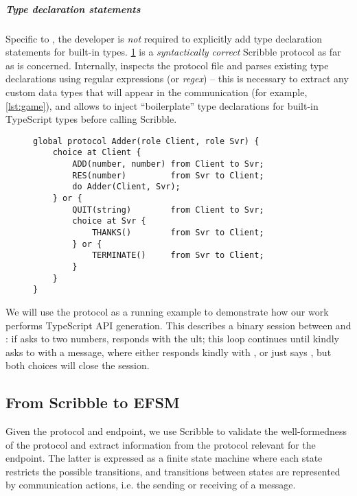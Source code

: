 \subparagraph{Type declaration statements}
Specific to \codegen,
the developer is \textit{not} required to explicitly
add type declaration statements for built-in types.
\cref{lst:adder} is a \textit{syntactically correct}
Scribble protocol as far as 
\codegen is concerned. 
Internally, \codegen inspects the protocol file
and parses existing type declarations using regular expressions
(or \textit{regex}) -- this is necessary to extract any
custom data types that will appear in the communication (for example,
\cref{lst:game}), and allows \codegen to inject
``boilerplate'' type declarations for built-in TypeScript types before
calling Scribble.

\begin{figure}[!ht]
\begin{lstlisting}[language=Scribble]
global protocol Adder(role Client, role Svr) {
	choice at Client {
		ADD(number, number) from Client to Svr;
		RES(number)         from Svr to Client;
		do Adder(Client, Svr);
	} or {
		QUIT(string) 		from Client to Svr;
		choice at Svr {
			THANKS()    	from Svr to Client;
		} or {
			TERMINATE() 	from Svr to Client;
		}
	}
}
\end{lstlisting}
\label{lst:adder}
\end{figure}

We will use the  protocol as a running example
to demonstrate how our work performs TypeScript API generation.
This describes a binary session between  and :
if  asks  to  two numbers,
 responds with the ult; this loop continues
until  kindly asks to  with a message,
where  either responds kindly with ,
or just says , but both choices will close the session.

\subsection{From Scribble to EFSM}
\label{subsection:efsm}

Given the protocol and endpoint, we use Scribble
to validate the well-formedness of the protocol and extract
information from the protocol relevant for the endpoint.
The latter is expressed as a finite state machine
where each state restricts the possible transitions, 
and transitions between states are represented by
communication actions, i.e. the sending or receiving of a message.

